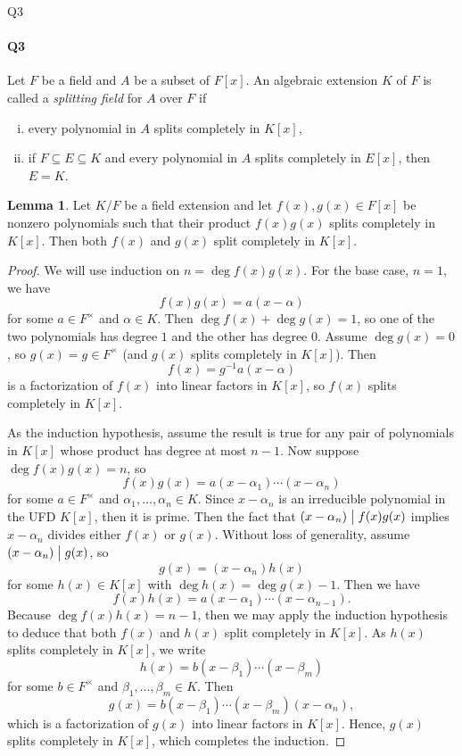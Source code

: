 \documentclass[12pt]{article}
\newenvironment{fullbox}{\begin{lrbox}{\savefullbox}\begin{minipage}{\dimexpr\textwidth-2\fboxsep\relax}}{\end{minipage}\end{lrbox}\begin{center}\framebox[\textwidth]{\usebox{\savefullbox}}\end{center}}
\newenvironment{pbox}[1][]{\begin{fullbox}\ifx#1\empty\else\paragraph{#1}\fi}{\end{fullbox}}
\theoremstyle{definition}
\newtheorem{lemma}{Lemma}
\newcommand{\divides}{\bigm|}
\begin{document}
\newpage
\begin{pbox}[Q3]
    Let $F$ be a field and $A$ be a subset of $F[x]$. An algebraic extension $K$ of $F$ is called a \textit{splitting field} for $A$ over $F$ if
    \begin{enumerate}[(i)]
        \item every polynomial in $A$ splits completely in $K[x]$,
        \item if $F \subseteq E \subseteq K$ and every polynomial in $A$ splits completely in $E[x]$, then $E = K$.
    \end{enumerate}
\end{pbox}

\begin{lemma}
    Let $K/F$ be a field extension and let $f(x), g(x) \in F[x]$ be nonzero polynomials such that their product $f(x)g(x)$ splits completely in $K[x]$. Then both $f(x)$ and $g(x)$ split completely in $K[x]$.
\end{lemma}

\begin{proof}
    We will use induction on $n = \deg f(x)g(x)$. For the base case, $n = 1$, we have 
    \[
        f(x)g(x) = a(x - \alpha)
    \]
    for some $a \in F^\times$ and $\alpha \in K$. Then $\deg f(x) + \deg g(x) = 1$, so one of the two polynomials has degree $1$ and the other has degree $0$. Assume $\deg g(x) = 0$, so $g(x) = g \in F^\times$ (and $g(x)$ splits completely in $K[x]$). Then
    \[
        f(x) = g^{-1}a(x - \alpha)
    \]
    is a factorization of $f(x)$ into linear factors in $K[x]$, so $f(x)$ splits completely in $K[x]$.

    As the induction hypothesis, assume the result is true for any pair of polynomials in $K[x]$ whose product has degree at most $n- 1$. Now suppose $\deg f(x)g(x) = n$, so
    \[
        f(x)g(x) = a(x - \alpha_1) \cdots (x - \alpha_n)
    \]
    for some $a \in F^\times$ and $\alpha_1, \dots, \alpha_n \in K$. Since $x - \alpha_n$ is an irreducible polynomial in the UFD $K[x]$, then it is prime. Then the fact that $(x - \alpha_n) \divides f(x)g(x)$ implies $x - \alpha_n$ divides either $f(x)$ or $g(x)$. Without loss of generality, assume $(x - \alpha_n) \divides g(x)$, so
    \[
        g(x) = (x- \alpha_n)h(x)
    \]
    for some $h(x) \in K[x]$ with $\deg h(x) = \deg g(x) - 1$. Then we have
    \[
        f(x)h(x) = a(x - \alpha_1) \cdots (x - \alpha_{n-1}).
    \]
    Because $\deg f(x)h(x) = n - 1$, then we may apply the induction hypothesis to deduce that both $f(x)$ and $h(x)$ split completely in $K[x]$. As $h(x)$ splits completely in $K[x]$, we write
    \[
        h(x) = b(x - \beta_1) \cdots (x - \beta_m)
    \]
    for some $b \in F^\times$ and $\beta_1, \dots, \beta_m \in K$. Then
    \[
        g(x) = b(x - \beta_1) \cdots (x - \beta_m)(x - \alpha_n),
    \]
    which is a factorization of $g(x)$ into linear factors in $K[x]$. Hence, $g(x)$ splits completely in $K[x]$, which completes the induction.

\end{proof}
\end{document}
